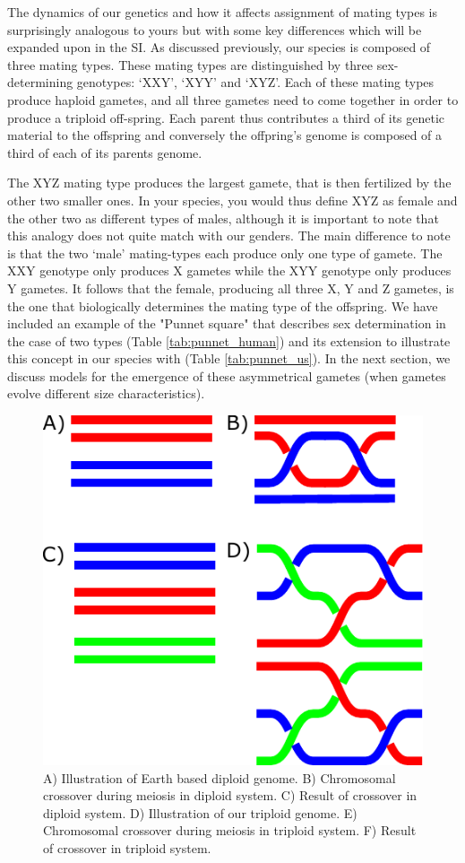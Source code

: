\documentclass{report}
\begin{document}
The dynamics of our genetics and how it affects assignment of mating types is surprisingly analogous to yours but with some key differences which will be expanded upon in the SI. As discussed previously, our species is composed of three mating types. These mating types are distinguished by three sex-determining genotypes: `XXY', `XYY' and `XYZ'.
Each of these mating types produce haploid gametes, and all three gametes need to come together in order to produce a triploid off-spring. Each parent thus contributes a third of its genetic material to the offspring and conversely the offpring's genome is composed of a third of each of its parents genome.

The XYZ mating type produces the largest gamete, that is then fertilized by the other two smaller ones. In your species, you would thus define XYZ as female and the other two as different types of males, although it is important to note that this analogy does not quite match with our genders. The main difference to note is that the two `male' mating-types each produce only one type of gamete. The XXY genotype only produces X gametes while the XYY genotype only produces Y gametes. It follows that the female, producing all three X, Y and Z gametes, is the one that biologically determines the mating type of the offspring. We have included an example of the "Punnet square" that describes sex determination in the case of two types (Table \ref{tab:punnet_human}) and its extension to illustrate this concept in our species with (Table \ref{tab:punnet_us}). In the next section, we discuss models for the emergence of these asymmetrical gametes (when gametes evolve different size characteristics). 

\begin{figure}
\centering
\includegraphics[width=0.4\columnwidth]{AshleyFig/cross_3.pdf}
\caption{A) Illustration of Earth based diploid genome. B) Chromosomal crossover during meiosis in diploid system. C) Result of crossover in diploid system. D) Illustration of our triploid genome. E) Chromosomal crossover during meiosis in triploid system. F) Result of crossover in triploid system.}
\label{fig:cross3}
\end{figure}
\end{document}
